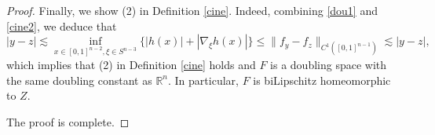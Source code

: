 \documentclass[10pt,a4paper]{amsart}
\begin{document}
\begin{proof}
\medskip

Finally, we show (2) in Definition \ref{cine}. Indeed, combining \eqref{dou1} and \eqref{cine2}, we deduce that
\begin{equation*}
 |y-z| \lesssim \inf_{x \in [0,1]^{n-2}, \xi \in S^{n-3}} \{ |h(x)| + |\nabla_\xi h(x)| \} \le  \|f_y-f_{z}\|_{C^1([0,1]^{n-1})} \lesssim |y-z|,
\end{equation*}
which implies that (2) in Definition \ref{cine} holds and
$F$ is a doubling space with the same doubling constant as $\mathbb{R}^{n}$. In particular, $F$ is biLipschitz homeomorphic to $Z$.


The proof is complete.
\end{proof}
\end{document}
